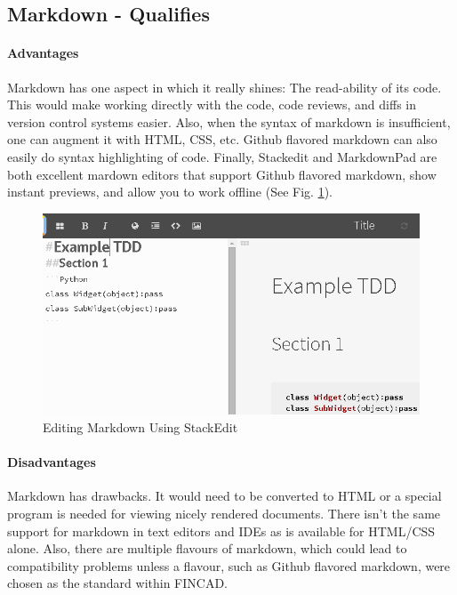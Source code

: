 \documentclass[]{article}
\begin{document}
\subsection{Markdown - Qualifies}
	\paragraph{Advantages}
	Markdown has one aspect in which it really shines: The read-ability of its code.  
	This would make working directly with the code, code reviews, and diffs in version control systems easier.  
	Also, when the syntax of markdown is insufficient, one can augment it with HTML, CSS, etc.  
	Github flavored markdown can also easily do syntax highlighting of code.  
	Finally, Stackedit and MarkdownPad are both excellent mardown editors that support Github flavored markdown, 
	show instant previews, and allow you to work offline (See Fig. \ref{StackEdit}).
	
	\begin{figure}[h]
		\centering
		\includegraphics[scale=.5]{StackEdit.png}
		\caption{Editing Markdown Using StackEdit}
		\label{StackEdit}
	\end{figure}
	
	\paragraph{Disadvantages}	
	Markdown has drawbacks. It would need to be converted to HTML or a special program is needed for viewing nicely rendered documents.  
	There isn't the same support for markdown in text editors and IDEs as is available for HTML/CSS alone.  
	Also, there are multiple flavours of markdown, which could lead to compatibility problems unless a flavour, 
	such as Github flavored markdown, were chosen as the standard within FINCAD.
\end{document}
